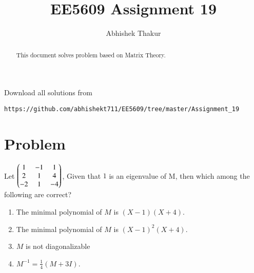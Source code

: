 \documentclass[journal,12pt,twocolumn]{IEEEtran}
\begin{document}
     \def\rightbox#1{\makebox[0in][r]{#1}}
     \def\centbox#1{\makebox[0in]{#1}}
     \def\topbox#1{\raisebox{-\baselineskip}[0in][0in]{#1}}
     \def\midbox#1{\raisebox{-0.5\baselineskip}[0in][0in]{#1}}
\vspace{3cm}
\title{EE5609 Assignment 19}
\author{Abhishek Thakur}
\maketitle
\bigskip
\renewcommand{\thefigure}{\theenumi}
\renewcommand{\thetable}{\theenumi}
\renewcommand{\labelenumi}{\alph{enumi})}
\begin{abstract}
This document solves problem based on Matrix Theory.
\end{abstract}
Download all solutions from 
\begin{lstlisting}
https://github.com/abhishekt711/EE5609/tree/master/Assignment_19
\end{lstlisting}
\section{Problem}
Let $\begin{pmatrix}1&-1&1\\2&1&4\\-2&1&-4\end{pmatrix}$, Given that $1$ is an eigenvalue of M, then which among the following are correct?
\begin{enumerate}
\item The minimal polynomial of $M$ is $(X-1)(X+4)$.
\item The minimal polynomial of $M$ is $(X-1)^2(X+4)$.
\item $M$ is not diagonalizable
\item $M^{-1}=\frac{1}{4}(M+3I)$.
\end{enumerate}
\end{document}
